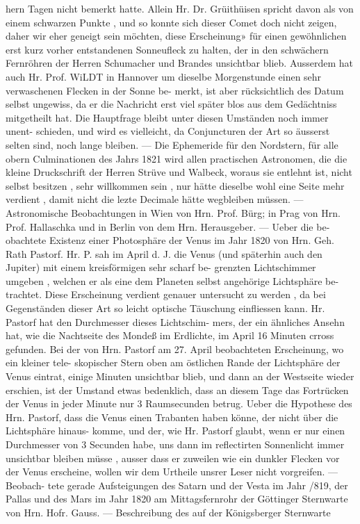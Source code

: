 \documentclass[12pt,a4paper]{article}
\begin{document}
{{{{{{{{hern  Tagen  nicht  bemerkt  hatte.  Allein  Hr.  Dr.  Grüithüisen  spricht  davon  als  von  einem  schwarzen Punkte ,  und  so  konnte  sich  dieser  Comet  doch  nicht  zeigen,  daher  wir  eher  geneigt  sein  möchten,  diese Erscheinung»  für  einen  gewöhnlichen  erst  kurz  vorher  entstandenen  Sonneufleck  zu  halten,  der  in  den schwächern  Fernröhren  der  Herren  Schumacher  und  Brandes  unsichtbar  blieb.  Ausserdem  hat  auch  Hr. Prof.  WiLDT  in  Hannover  um  dieselbe  Morgenstunde  einen  sehr  verwaschenen  Flecken  in  der  Sonne  be- merkt, ist  aber  rücksichtlich  des  Datum  selbst  ungewiss,  da  er  die  Nachricht  erst  viel  später  blos  aus dem  Gedächtniss  mitgetheilt  hat.  Die  Hauptfrage  bleibt  unter  diesen  Umständen  noch  immer  unent- schieden, und  wird  es  vielleicht,  da  Conjuncturen  der  Art  so  äusserst  selten  sind,  noch  lange  bleiben. --- Die  Ephemeride  für  den  Nordstern,  für  alle  obern  Culminationen  des  Jahrs  1821  wird  allen  practischen Astronomen,  die  die  kleine  Druckschrift  der  Herren  Strüve  und  Walbeck,  woraus  sie  entlehnt  ist,  nicht selbst  besitzen ,  sehr  willkommen  sein ,  nur  hätte  dieselbe  wohl  eine  Seite  mehr  verdient ,  damit  nicht die  lezte  Decimale  hätte  wegbleiben  müssen.  ---  Astronomische  Beobachtungen  in  Wien  von  Hrn.  Prof. Bürg;  in  Prag  von  Hrn.  Prof.  Hallaschka  und  in  Berlin  von  dem  Hrn.  Herausgeber.  ---  Ueber  die  be- obachtete Existenz  einer  Photosphäre  der  Venus  im  Jahr  1820  von  Hrn.  Geh.  Rath  Pastorf.  Hr.  P. sah  im  April  d.  J.  die  Venus  (und  späterhin  auch  den  Jupiter)  mit  einem  kreisförmigen  sehr  scharf  be- grenzten Lichtschimmer  umgeben ,  welchen  er  als  eine  dem  Planeten  selbst  angehörige  Lichtsphäre  be- trachtet. Diese  Erscheinung  verdient  genauer  untersucht  zu  werden ,  da  bei  Gegenständen  dieser  Art so  leicht  optische  Täuschung  einfliessen  kann.  Hr.  Pastorf  hat  den  Durchmesser  dieses  Lichtschim- mers, der  ein  ähnliches  Ansehn  hat,  wie  die  Nachtseite  des  Mondeß  im  Erdlichte,  im  April  16  Minuten crross  gefunden.  Bei  der  von  Hrn.  Pastorf  am  27.  April  beobachteten  Erscheinung,  wo  ein  kleiner  tele- skopischer Stern  oben  am  östlichen  Rande  der  Lichtsphäre  der  Venus  eintrat,  einige  Minuten  unsichtbar blieb,  und  dann  an  der  Westseite  wieder  erschien,  ist  der  Umstand  etwas  bedenklich,  dass  an  diesem Tage  das  Fortrücken  der  Venus  in  jeder  Minute  nur  3  Raumsecunden  betrug.  Ueber  die  Hypothese  des Hrn.  Pastorf,  dass  die  Venus  einen  Trabanten  haben  könne,  der  nicht  über  die  Lichtsphäre  hinaus- komme, und  der,  wie  Hr.  Pastorf  glaubt,  wenn  er  nur  einen  Durchmesser  von  3  Secunden  habe,  uns  dann im  reflectirten  Sonnenlicht  immer  unsichtbar  bleiben  müsse ,  ausser  dass  er  zuweilen  wie  ein  dunkler Flecken  vor  der  Venus  erscheine,  wollen  wir  dem  Urtheile  unsrer  Leser  nicht  vorgreifen.  ---  Beobach- tete gerade  Aufsteigungen  des  Satarn  und  der  Vesta  im  Jahr  /819,  der  Pallas  und  des  Mars  im  Jahr 1820  am  Mittagsfernrohr  der  Göttinger  Sternwarte  von  Hrn.  Hofr.  Gauss.  ---  Beschreibung  des  auf  der Königsberger  Sternwarte  }}}}}}}}
\end{document}
